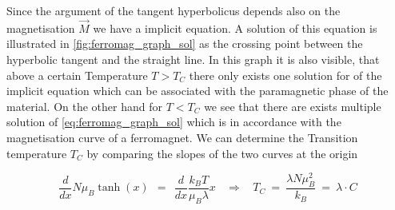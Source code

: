 \documentclass[10pt]{report}
\numberwithin{equation}{chapter}
\begin{document}
Since the argument of the tangent hyperbolicus depends also on the magnetisation $\vec{M}$ we have a implicit equation. A solution of this equation is illustrated in \ref{fig:ferromag_graph_sol} as the crossing point between the hyperbolic tangent and the straight line. In this graph it is also visible, that above a certain Temperature $T>T_C$ there only exists one solution for of the implicit equation which can be associated with the paramagnetic phase of the material. On the other hand for $T<T_C$ we see that there are exists multiple solution of \ref{eq:ferromag_graph_sol} which is in accordance with the magnetisation curve of a ferromagnet. We can determine the Transition temperature $T_C$ by comparing the slopes of the two curves at the origin

\begin{equation}
  \frac{d}{dx} N \mu_B \tanh(x) ~~ = ~~ \frac{d}{dx} \frac{k_BT}{\mu_B \lambda} x ~~~~ \Rightarrow ~~~~
  T_C ~=~\frac{\lambda N \mu_B^2}{k_B} ~=~ \lambda \cdot C
\end{equation}
\end{document}
